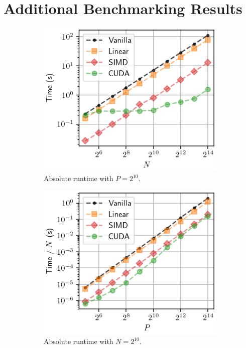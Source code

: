 \section{Additional Benchmarking Results}
\begin{figure}[htbp]
    \centering
    \begin{subfigure}{.49\textwidth}
        \includegraphics[width=.8\textwidth]{img/desktop/abs_performance-N.png}
        \caption{Absolute runtime with $P = 2^{10}$.}
    \end{subfigure}
    \begin{subfigure}{.49\textwidth}
        \includegraphics[width=.8\textwidth]{img/desktop/abs_performance-pP.png}
        \caption{Absolute runtime with $N = 2^{10}$.}
    \end{subfigure}\\
    \begin{subfigure}{.49\textwidth}

\end{subfigure}
\end{figure}
